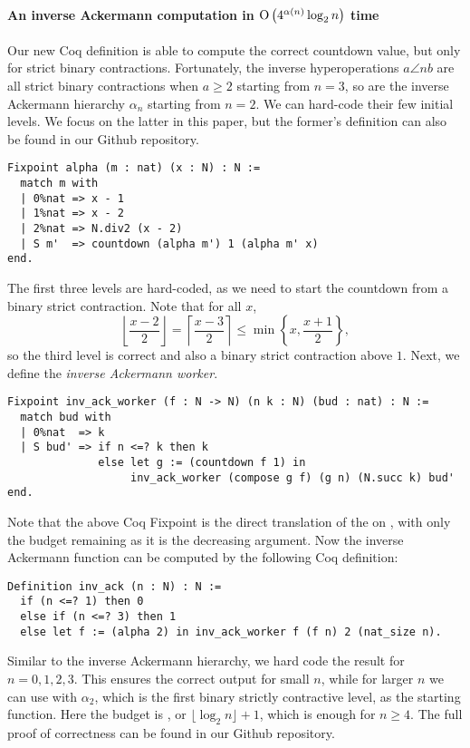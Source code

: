 \paragraph*{An inverse Ackermann computation in $\text{O}\left(4^{\alpha(n)}\log_2 n\right)$ time}
Our new Coq definition is able to compute the correct countdown value, but only for strict binary contractions. Fortunately, the inverse hyperoperations $a\angle{n}b$ are all strict binary contractions when $a\ge 2$ starting from $n = 3$, so are the inverse Ackermann hierarchy $\alpha_n$ starting from $n = 2$. We can hard-code their few initial levels. We focus on the latter in this paper, but the former's definition can also be found in our Github repository.
\begin{lstlisting}
Fixpoint alpha (m : nat) (x : N) : N :=
  match m with
  | 0%nat => x - 1
  | 1%nat => x - 2
  | 2%nat => N.div2 (x - 2)
  | S m'  => countdown (alpha m') 1 (alpha m' x)
end.
\end{lstlisting}
The first three levels are hard-coded, as we need to start the countdown from a binary strict contraction. Note that for all $x$,
\begin{equation*}
\left\lfloor \frac{x - 2}{2} \right\rfloor = \left\lceil \frac{x - 3}{2} \right\rceil \le \min\left\{x, \frac{x + 1}{2}\right\},
\end{equation*}
so the third level is correct and also a binary strict contraction above $1$. Next, we define the \emph{inverse Ackermann worker}.
\begin{lstlisting}
Fixpoint inv_ack_worker (f : N -> N) (n k : N) (bud : nat) : N :=
  match bud with
  | 0%nat  => k
  | S bud' => if n <=? k then k
              else let g := (countdown f 1) in
                   inv_ack_worker (compose g f) (g n) (N.succ k) bud'
end.
\end{lstlisting}
Note that the above Coq Fixpoint is the direct translation of the  on , with only the budget remaining  as it is the decreasing argument. Now the inverse Ackermann function can be computed by the following Coq definition:
\begin{lstlisting}
Definition inv_ack (n : N) : N :=
  if (n <=? 1) then 0
  else if (n <=? 3) then 1
  else let f := (alpha 2) in inv_ack_worker f (f n) 2 (nat_size n).
\end{lstlisting}
Similar to the inverse Ackermann hierarchy, we hard code the result for $n = 0,1,2,3$. This ensures the correct output for small $n$, while for larger $n$ we can use  with $\alpha_2$, which is the first binary strictly contractive level, as the starting function. Here the budget is , or $\lfloor \log_2n \rfloor + 1$, which is enough for $n\ge 4$. The full proof of correctness can be found in our Github repository.

